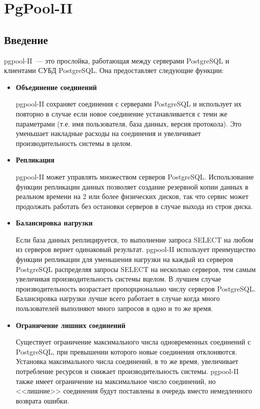 \chapter{PgPool-II}
\begin{epigraphs}
\end{epigraphs}
\section{Введение}
pgpool-II~--- это прослойка, работающая между серверами PostgreSQL и клиентами СУБД PostgreSQL.
Она предоставляет следующие функции:
\begin{itemize}
\item \textbf{Объединение соединений}

pgpool-II сохраняет соединения с серверами PostgreSQL и использует их повторно в случае если новое
соединение устанавливается с теми же параметрами (т.е. имя пользователя, база данных, версия протокола).
Это уменьшает накладные расходы на соединения и увеличивает производительность системы в целом.

\item \textbf{Репликация}

pgpool-II может управлять множеством серверов PostgreSQL. Использование функции репликации данных позволяет
создание резервной копии данных в реальном времени на  2 или более физических дисков, так что сервис может
продолжать работать без остановки серверов в случае выхода из строя диска.

\item \textbf{Балансировка нагрузки}

Если база данных реплицируется, то выполнение запроса SELECT на любом из серверов вернет одинаковый результат.
pgpool-II использует преимущество функции репликации для уменьшения нагрузки на каждый из серверов PostgreSQL
распределяя запросы SELECT на несколько серверов, тем самым увеличивая производительность системы вцелом.
В лучшем случае производительность возрастает пропорционально числу серверов PostgreSQL. Балансировка нагрузки
лучше всего работает в случае когда много пользователей выполняют много запросов в одно и то же время.

\item \textbf{Ограничение лишних соединений}

Существует ограничение максимального числа одновременных соединений с PostgreSQL, при превышении которого новые
соединения отклоняются. Установка максимального числа соединений, в то же время, увеличивает потребление ресурсов и
снижает производительность системы. pgpool-II также имеет ограничение на максимальное число соединений, но <<лишние>>
соединения будут поставлены в очередь вместо немедленного возврата ошибки.


\end{itemize}
